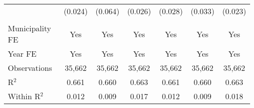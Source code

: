 \documentclass[12pt]{article}
\begin{document}
\begin{table}[htbp]
\begin{adjustbox}{width=\textwidth,center}
\begin{tabular}{lcccccc}
      & (0.024) & (0.064) & (0.026) & (0.028) & (0.033) & (0.023) \\\\
      \midrule
      Municipality FE & Yes & Yes & Yes & Yes & Yes & Yes \\
      Year FE & Yes & Yes & Yes & Yes & Yes & Yes \\
      Observations & 35,662 & 35,662 & 35,662 & 35,662 & 35,662 & 35,662 \\
      R$^2$ & 0.661 & 0.660 & 0.663 & 0.661 & 0.660 & 0.663 \\
      Within R$^2$ & 0.012 & 0.009 & 0.017 & 0.012 & 0.009 & 0.018 \\
      \midrule \midrule
   \end{tabular}
   \end{adjustbox}
\end{table}
\end{document}
